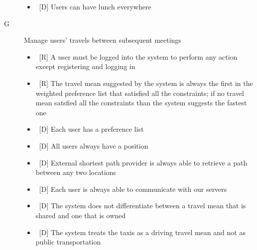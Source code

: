 \begin{description}
\begin{itemize}
\item~[D] Users can have lunch everywhere
\end{itemize}

\item[G\thecountReq] Manage users’ travels between subsequent meetings

\begin{itemize}
\item~[R] A user must be logged into the system to perform any action except registering and logging in
\item~[R] The travel mean suggested by the system is always the first in the weighted preference list that satisfied all the constraints; if no travel mean satsfied all the constraints than the system suggests the fastest one
\end{itemize}

\begin{itemize}
\item~[D] Each user has a preference list
\item~[D] All users always have a position
\item~[D] External shortest path provider is always able to retrieve a path between any two locations
\item~[D] Each user is always able to communicate with our servers
\item~[D] The system does not differentiate between a travel mean that is shared and one that is owned
\item~[D] The system treats the taxis as a driving travel mean and not as public transportation
\end{itemize}
\end{description}
